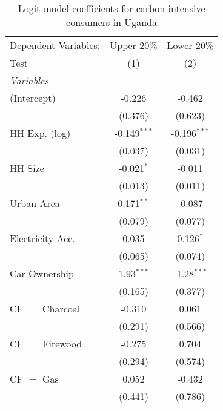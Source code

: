 
\begin{table}[htbp!]
   \centering
   \small
   \begin{adjustbox}{width = 1\textwidth, max height = 0.95\textheight, center}
      \begin{threeparttable}[b]
         \caption{\label{tab:Logit_1_UGA} Logit-model coefficients for carbon-intensive consumers in Uganda}
         \begin{tabular}{lcc}
            \tabularnewline \midrule \midrule
            Dependent Variables: & Upper 20\%     & Lower 20\%\\   
            Test                 & (1)            & (2)\\  
            \midrule
            \emph{Variables}\\
            (Intercept)          & -0.226         & -0.462\\   
                                 & (0.376)        & (0.623)\\   
            HH Exp. (log)        & -0.149$^{***}$ & -0.196$^{***}$\\   
                                 & (0.037)        & (0.031)\\   
            HH Size              & -0.021$^{*}$   & -0.011\\   
                                 & (0.013)        & (0.011)\\   
            Urban Area           & 0.171$^{**}$   & -0.087\\   
                                 & (0.079)        & (0.077)\\   
            Electricity Acc.     & 0.035          & 0.126$^{*}$\\   
                                 & (0.065)        & (0.074)\\   
            Car Ownership        & 1.93$^{***}$   & -1.28$^{***}$\\   
                                 & (0.165)        & (0.377)\\   
            CF $=$ Charcoal      & -0.310         & 0.061\\   
                                 & (0.291)        & (0.566)\\   
            CF $=$ Firewood      & -0.275         & 0.704\\   
                                 & (0.294)        & (0.574)\\   
            CF $=$ Gas           & 0.052          & -0.432\\   
                                 & (0.441)        & (0.786)\\   

\end{tabular}
\end{threeparttable}
\end{adjustbox}
\end{table}
